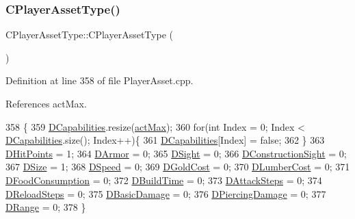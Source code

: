 \subsubsection{\texorpdfstring{C\+Player\+Asset\+Type()}{CPlayerAssetType()}\hspace{0.1cm}{\footnotesize\ttfamily [1/2]}}
{\footnotesize\ttfamily C\+Player\+Asset\+Type\+::\+C\+Player\+Asset\+Type (\begin{DoxyParamCaption}{ }\end{DoxyParamCaption})}



Definition at line 358 of file Player\+Asset.\+cpp.



References act\+Max.


\begin{DoxyCode}
358                                   \{
359     \hyperlink{classCPlayerAssetType_a243f9161c56446b378dc42b51977fc58}{DCapabilities}.resize(\hyperlink{GameDataTypes_8h_a35b98ce26aca678b03c6f9f76e4778cea77dccd39fc9e5ee854223444006a6f70}{actMax});
360     \textcolor{keywordflow}{for}(\textcolor{keywordtype}{int} Index = 0; Index < \hyperlink{classCPlayerAssetType_a243f9161c56446b378dc42b51977fc58}{DCapabilities}.size(); Index++)\{
361         \hyperlink{classCPlayerAssetType_a243f9161c56446b378dc42b51977fc58}{DCapabilities}[Index] = \textcolor{keyword}{false};
362     \}
363     \hyperlink{classCPlayerAssetType_a0f10bff263838914bf347d9e9bf0af68}{DHitPoints} = 1;
364     \hyperlink{classCPlayerAssetType_ac211254f807a497099509a3e96f7185a}{DArmor} = 0;
365     \hyperlink{classCPlayerAssetType_afa32c3f45737443299a4e681dfe64911}{DSight} = 0;
366     \hyperlink{classCPlayerAssetType_a71b34081d4540087472af3cb9052e04a}{DConstructionSight} = 0;
367     \hyperlink{classCPlayerAssetType_a00e59fe19f83fe37f23341c05010dbc2}{DSize} = 1;
368     \hyperlink{classCPlayerAssetType_a0e72be67119e97fb64a6036cd5da8d1a}{DSpeed} = 0;
369     \hyperlink{classCPlayerAssetType_a2153f3ed158144fc517efd2866de0017}{DGoldCost} = 0;
370     \hyperlink{classCPlayerAssetType_aab2aeb930d654fd5eab51be157b3439f}{DLumberCost} = 0;
371     \hyperlink{classCPlayerAssetType_a8fcab35c2b576476b6f2c80c8b8762fb}{DFoodConsumption} = 0;
372     \hyperlink{classCPlayerAssetType_aa65de0691276352ebc3c3a9936a74278}{DBuildTime} = 0;
373     \hyperlink{classCPlayerAssetType_af2a95fbee4ed2ac1ff1da0f649966a6d}{DAttackSteps} = 0;
374     \hyperlink{classCPlayerAssetType_a192d6ac421608663d18d1a0cda00841e}{DReloadSteps} = 0;
375     \hyperlink{classCPlayerAssetType_ade46bb31e24e01ba4b523bdf67472d59}{DBasicDamage} = 0;
376     \hyperlink{classCPlayerAssetType_af7303175365306fb69e5ff9170b72234}{DPiercingDamage} = 0;
377     \hyperlink{classCPlayerAssetType_a1204a9470d8940fdb81a63670a0f6779}{DRange} = 0;
378 \}
\end{DoxyCode}
\hypertarget{classCPlayerAssetType_af571a936c745e23f1f3c6777af594efe}{}\label{classCPlayerAssetType_af571a936c745e23f1f3c6777af594efe} 

